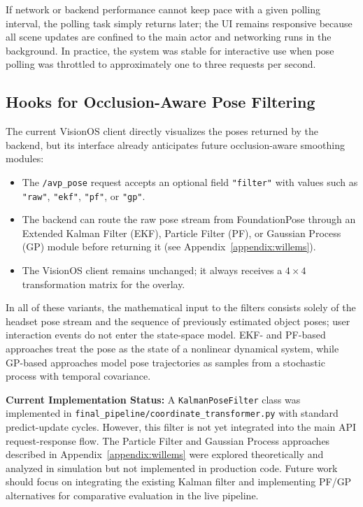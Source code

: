 If network or backend performance cannot keep pace with a given polling interval, the polling task simply returns later; the UI remains responsive because all scene updates are confined to the main actor and networking runs in the background. In practice, the system was stable for interactive use when pose polling was throttled to approximately one to three requests per second.

\subsection{Hooks for Occlusion-Aware Pose Filtering}

The current VisionOS client directly visualizes the poses returned by the backend, but its interface already anticipates future occlusion-aware smoothing modules:

\begin{itemize}
    \item The \texttt{/avp\_pose} request accepts an optional field \texttt{"filter"} with values such as \texttt{"raw"}, \texttt{"ekf"}, \texttt{"pf"}, or \texttt{"gp"}.
    \item The backend can route the raw pose stream from FoundationPose through an Extended Kalman Filter (EKF), Particle Filter (PF), or Gaussian Process (GP) module before returning it (see Appendix~\ref{appendix:willems}).
    \item The VisionOS client remains unchanged; it always receives a $4\times 4$ transformation matrix for the overlay.
\end{itemize}

In all of these variants, the mathematical input to the filters consists solely of the headset pose stream and the sequence of previously estimated object poses; user interaction events do not enter the state-space model. EKF- and PF-based approaches treat the pose as the state of a nonlinear dynamical system, while GP-based approaches model pose trajectories as samples from a stochastic process with temporal covariance.

\textbf{Current Implementation Status:} A \texttt{KalmanPoseFilter} class was implemented in \texttt{final\_pipeline/coordinate\_transformer.py} with standard predict-update cycles. However, this filter is not yet integrated into the main API request-response flow. The Particle Filter and Gaussian Process approaches described in Appendix~\ref{appendix:willems} were explored theoretically and analyzed in simulation but not implemented in production code. Future work should focus on integrating the existing Kalman filter and implementing PF/GP alternatives for comparative evaluation in the live pipeline.
